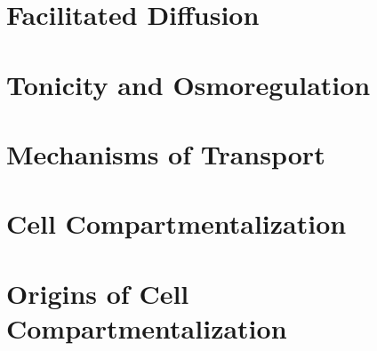 \documentclass[../bio.tex]{subfiles}
\begin{document}
\section{Facilitated Diffusion}
\section{Tonicity and Osmoregulation}
\section{Mechanisms of Transport}
\section{Cell Compartmentalization}
\section{Origins of Cell Compartmentalization}
\end{document}
